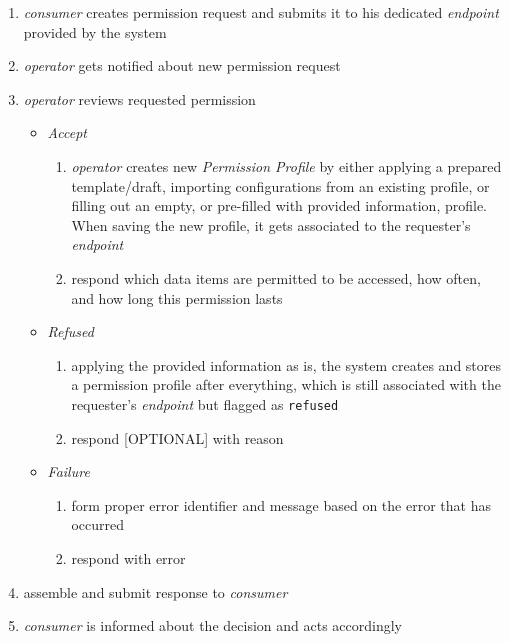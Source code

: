 \documentclass[12pt,english,a4paper,titlepage,cleardoublepage=empty,dottedtoc]{report}
\providecommand{\tightlist}{%
  \setlength{\itemsep}{0pt}\setlength{\parskip}{0pt}}
\begin{document}
\begin{enumerate}
\def\labelenumi{\arabic{enumi}.}
\item
  \emph{consumer} creates permission request and submits it to his
  dedicated \emph{endpoint} provided by the system
\item
  \emph{operator} gets notified about new permission request
\item
  \emph{operator} reviews requested permission

  \begin{itemize}
  \tightlist
  \item
    \emph{Accept}

    \begin{enumerate}
    \def\labelenumii{\arabic{enumii})}
    \tightlist
    \item
      \emph{operator} creates new \emph{Permission Profile} by either
      applying a prepared template/draft, importing configurations from
      an existing profile, or filling out an empty, or pre-filled with
      provided information, profile. When saving the new profile, it
      gets associated to the requester's \emph{endpoint}
    \item
      respond which data items are permitted to be accessed, how often,
      and how long this permission lasts
    \end{enumerate}
  \item
    \emph{Refused}

    \begin{enumerate}
    \def\labelenumii{\arabic{enumii})}
    \tightlist
    \item
      applying the provided information as is, the system creates and
      stores a permission profile after everything, which is still
      associated with the requester's \emph{endpoint} but flagged as
      \texttt{refused}
    \item
      respond {[}OPTIONAL{]} with reason
    \end{enumerate}
  \item
    \emph{Failure}

    \begin{enumerate}
    \def\labelenumii{\arabic{enumii})}
    \tightlist
    \item
      form proper error identifier and message based on the error that
      has occurred
    \item
      respond with error
    \end{enumerate}
  \end{itemize}
\item
  assemble and submit response to \emph{consumer}
\item
  \emph{consumer} is informed about the decision and acts accordingly


\end{enumerate}
\end{document}
